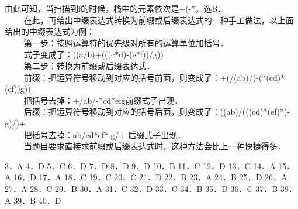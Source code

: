 由此可知，当扫描到f的时候，栈中的元素依次是+(-*，选B． \\
$\qquad$ 在此，再给出中缀表达式转换为前缀或后缀表达式的一种手工做法，以上面给出的中缀表达式为例： \\
$\qquad$ 第一步：按照运算符的优先级对所有的运算单位加括号． \\
$\qquad$ 式子变成了：((a/b)+(((c*d)-(e*f))/g)) \\
$\qquad$ 第二步：转换为前缀或后缀表达式． \\
$\qquad$ 前缀：把运算符号移动到对应的括号前面，则变成了：+(/(ab)/(-(*(cd)*(ef))g))  \\
$\qquad$ 把括号去掉：+/ab/-*cd*efg前缀式子出现． \\
$\qquad$ 后缀：把运算符号移动到对应的括号后面，则变成了：((ab)/(((cd)*(ef)*)-g)/)+  \\
$\qquad$ 把括号去掉：ab/cd*ef*-g/+ 后缀式子出现．  \\
$\qquad$ 当题目要求直接求前缀或后缀表达式时，这种方法会比上一种快捷得多．

3．A
4．D
5．C
6．D
7．D
8．D
9．D
10．B
11．C
12．D
13．C
14．A
15．A
16．D
17．A
18．C
19．C
20．C
21．D
22．B
23．A
24．B
25．D
26．A
27．A
28．C
29．B
30．A
31．C
32．D
33．C
34．B
35．D
36．C
37．B
38．A
39．B
40．D